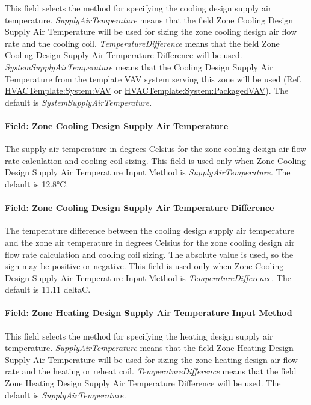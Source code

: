 This field selects the method for specifying the cooling design supply air temperature. \emph{SupplyAirTemperature} means that the field Zone Cooling Design Supply Air Temperature will be used for sizing the zone cooling design air flow rate and the cooling coil. \emph{TemperatureDifference} means that the field Zone Cooling Design Supply Air Temperature Difference will be used. \emph{SystemSupplyAirTemperature} means that the Cooling Design Supply Air Temperature from the template VAV system serving this zone will be used (Ref. \hyperref[hvactemplatesystemvav]{HVACTemplate:System:VAV} or \hyperref[hvactemplatesystempackagedvav]{HVACTemplate:System:PackagedVAV}). The default is \emph{SystemSupplyAirTemperature.}

\paragraph{Field: Zone Cooling Design Supply Air Temperature}\label{field-zone-cooling-design-supply-air-temperature-7}

The supply air temperature in degrees Celsius for the zone cooling design air flow rate calculation and cooling coil sizing. This field is used only when Zone Cooling Design Supply Air Temperature Input Method is \emph{SupplyAirTemperature.} The default is 12.8°C.

\paragraph{Field: Zone Cooling Design Supply Air Temperature Difference}\label{field-zone-cooling-design-supply-air-temperature-difference-8}

The temperature difference between the cooling design supply air temperature and the zone air temperature in degrees Celsius for the zone cooling design air flow rate calculation and cooling coil sizing. The absolute value is used, so the sign may be positive or negative. This field is used only when Zone Cooling Design Supply Air Temperature Input Method is \emph{TemperatureDifference.} The default is 11.11 deltaC.

\paragraph{Field: Zone Heating Design Supply Air Temperature Input Method}\label{field-zone-heating-design-supply-air-temperature-input-method-8}

This field selects the method for specifying the heating design supply air temperature. \emph{SupplyAirTemperature} means that the field Zone Heating Design Supply Air Temperature will be used for sizing the zone heating design air flow rate and the heating or reheat coil. \emph{TemperatureDifference} means that the field Zone Heating Design Supply Air Temperature Difference will be used. The default is \emph{SupplyAirTemperature.}

